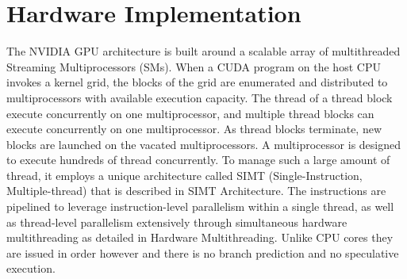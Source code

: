 \documentclass[openany]{book}
\begin{document}
\section{Hardware Implementation}%
The NVIDIA GPU architecture is built around a scalable array of multithreaded Streaming Multiprocessors (SMs). When a CUDA program on the host CPU invokes a kernel grid, the blocks of the grid are enumerated and distributed to multiprocessors with available execution capacity. The thread of a thread block execute concurrently on one multiprocessor, and multiple thread blocks can execute concurrently on one multiprocessor. As thread blocks terminate, new blocks are launched on the vacated multiprocessors.
A multiprocessor is designed to execute hundreds of thread concurrently. To manage such a large amount of thread, it employs a unique architecture called SIMT (Single-Instruction, Multiple-thread) that is described in SIMT Architecture. The instructions are pipelined to leverage instruction-level parallelism within a single thread, as well as thread-level parallelism extensively through simultaneous hardware multithreading as detailed in Hardware Multithreading. Unlike CPU cores they are issued in order however and there is no branch prediction and no speculative execution.
\end{document}
